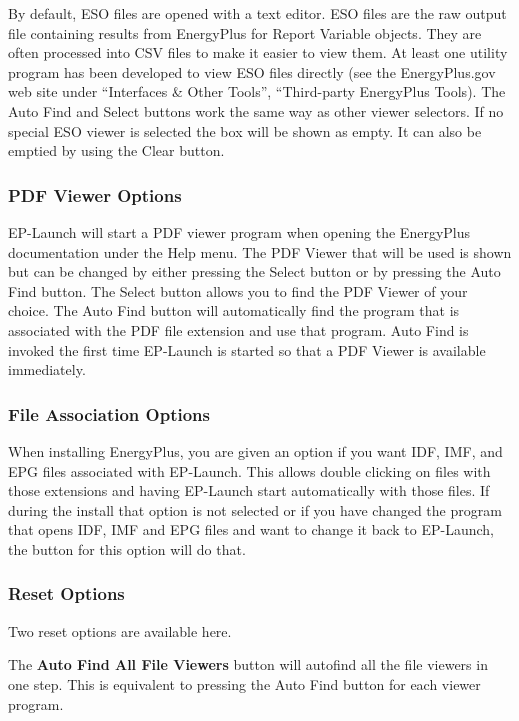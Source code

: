 By default, ESO files are opened with a text editor. ESO files are the raw output file containing results from EnergyPlus for Report Variable objects. They are often processed into CSV files to make it easier to view them. At least one utility program has been developed to view ESO files directly (see the EnergyPlus.gov web site under ``Interfaces \& Other Tools'', ``Third-party EnergyPlus Tools). The Auto Find and Select buttons work the same way as other viewer selectors. If no special ESO viewer is selected the box will be shown as empty. It can also be emptied by using the Clear button.

\subsubsection{PDF Viewer Options}\label{pdf-viewer-options}

EP-Launch will start a PDF viewer program when opening the EnergyPlus documentation under the Help menu. The PDF Viewer that will be used is shown but can be changed by either pressing the Select button or by pressing the Auto Find button. The Select button allows you to find the PDF Viewer of your choice. The Auto Find button will automatically find the program that is associated with the PDF file extension and use that program. Auto Find is invoked the first time EP-Launch is started so that a PDF Viewer is available immediately.

\subsubsection{File Association Options}\label{file-association-options}

When installing EnergyPlus, you are given an option if you want IDF, IMF, and EPG files associated with EP-Launch. This allows double clicking on files with those extensions and having EP-Launch start automatically with those files. If during the install that option is not selected or if you have changed the program that opens IDF, IMF and EPG files and want to change it back to EP-Launch, the button for this option will do that.

\subsubsection{Reset Options}\label{reset-options}

Two reset options are available here.

The \textbf{Auto Find All File Viewers} button will autofind all the file viewers in one step. This is equivalent to pressing the Auto Find button for each viewer program.

